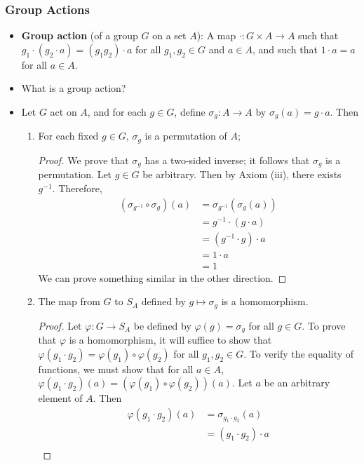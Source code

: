 \documentclass[../main.tex]{subfiles}
\begin{document}
\subsubsection{Group Actions}
\begin{itemize}
    \item \textbf{Group action} (of a group $G$ on a set $A$): A map $\cdot:G\times A\to A$ such that $g_1\cdot(g_2\cdot a)=(g_1g_2)\cdot a$ for all $g_1,g_2\in G$ and $a\in A$, and such that $1\cdot a=a$ for all $a\in A$.
    \item What is a group action?
    \item Let $G$ act on $A$, and for each $g\in G$, define $\sigma_g:A\to A$ by $\sigma_g(a)=g\cdot a$. Then
    \begin{enumerate}
        \item For each fixed $g\in G$, $\sigma_g$ is a permutation of $A$;
        \begin{proof}
            We prove that $\sigma_g$ has a two-sided inverse; it follows that $\sigma_g$ is a permutation. Let $g\in G$ be arbitrary. Then by Axiom (iii), there exists $g^{-1}$. Therefore,
            \begin{align*}
                (\sigma_{g^{-1}}\circ\sigma_g)(a) &= \sigma_{g^{-1}}(\sigma_g(a))\\
                &= g^{-1}\cdot(g\cdot a)\\
                &= (g^{-1}\cdot g)\cdot a\\
                &= 1\cdot a\\
                &= 1
            \end{align*}
            We can prove something similar in the other direction.
        \end{proof}
        \item The map from $G$ to $S_A$ defined by $g\mapsto\sigma_g$ is a homomorphism.
        \begin{proof}
            Let $\varphi:G\to S_A$ be defined by $\varphi(g)=\sigma_g$ for all $g\in G$. To prove that $\varphi$ is a homomorphism, it will suffice to show that $\varphi(g_1\cdot g_2)=\varphi(g_1)\circ\varphi(g_2)$ for all $g_1,g_2\in G$. To verify the equality of functions, we must show that for all $a\in A$, $\varphi(g_1\cdot g_2)(a)=(\varphi(g_1)\circ\varphi(g_2))(a)$. Let $a$ be an arbitrary element of $A$. Then
            \begin{align*}
                \varphi(g_1\cdot g_2)(a) &= \sigma_{g_1\cdot g_2}(a)\\
                &= (g_1\cdot g_2)\cdot a\\

\end{align*}
\end{proof}
\end{enumerate}
\end{itemize}
\end{document}

